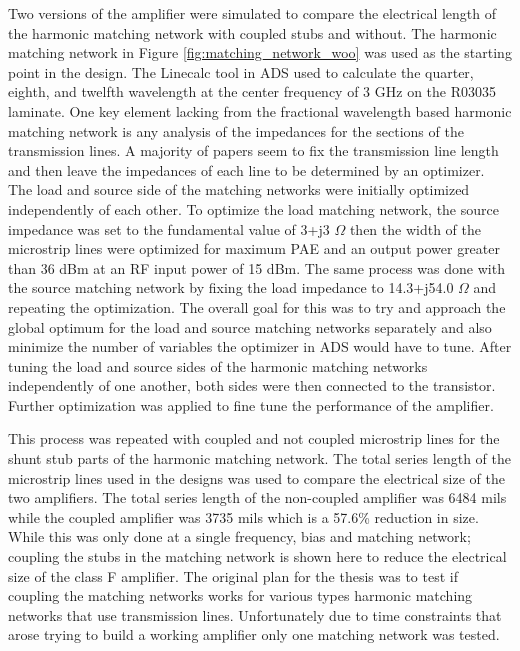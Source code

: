 Two versions of the amplifier were simulated to compare the electrical length of the harmonic matching network with coupled stubs and without. The harmonic matching network in Figure \ref{fig:matching_network_woo} was used as the starting point in the design. The Linecalc tool in ADS used to calculate the quarter, eighth, and twelfth wavelength at the center frequency of 3 GHz on the R03035 laminate. One key element lacking from the fractional wavelength based harmonic matching network is any analysis of the impedances for the sections of the transmission lines. A majority of papers seem to fix the transmission line length and then leave the impedances of each line to be determined by an optimizer. The load and source side of the matching networks were initially optimized independently of each other. To optimize the load matching network, the source impedance was set to the fundamental value of 3+j3 $\Omega$ then the width of the microstrip lines were optimized for maximum PAE and an output power greater than 36 dBm at an RF input power of 15 dBm. The same process was done with the source matching network by fixing the load impedance to 14.3+j54.0 $\Omega$ and repeating the optimization. The overall goal for this was to try and approach the global optimum for the load and source matching networks separately and also minimize the number of variables the optimizer in ADS would have to tune. After tuning the load and source sides of the harmonic matching networks independently of one another, both sides were then connected to the transistor. Further optimization was applied to fine tune the performance of the amplifier.

This process was repeated with coupled and not coupled microstrip lines for the shunt stub parts of the harmonic matching network. The total series length of the microstrip lines used in the designs was used to compare the electrical size of the two amplifiers. The total series length of the non-coupled amplifier was 6484 mils while the coupled amplifier was 3735 mils which is a 57.6\% reduction in size. While this was only done at a single frequency, bias and matching network; coupling the stubs in the matching network is shown here to reduce the electrical size of the class F amplifier. The original plan for the thesis was to test if coupling the matching networks works for various types harmonic matching networks that use transmission lines. Unfortunately due to time constraints that arose trying to build a working amplifier only one matching network was tested.

